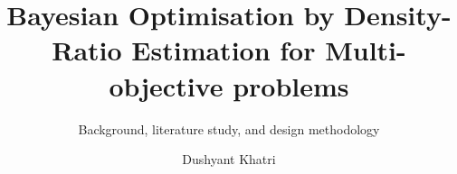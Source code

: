 \documentclass{layout/layout-format}
\begin{document}
	
	\title{Bayesian Optimisation by Density-Ratio Estimation for Multi-objective problems}
	\subtitle{Background, literature study, and design methodology}
	\author{Dushyant Khatri}
	\makecover

	\frontmatter
	
	
	
	
	\tableofcontents

	\mainmatter
	
	
	
	
	
	
	
	
\end{document}

